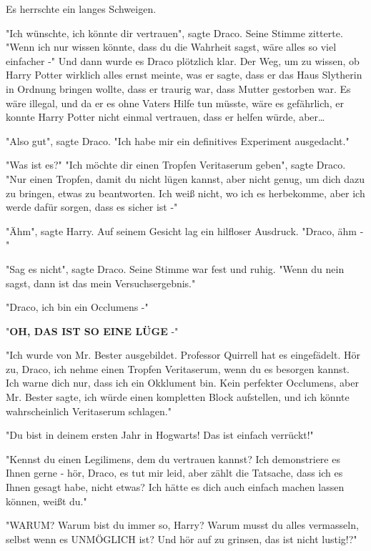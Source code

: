 {Es herrschte ein langes Schweigen.

"Ich wünschte, ich könnte dir vertrauen", sagte Draco. Seine Stimme zitterte. "Wenn ich nur wissen könnte, dass du die Wahrheit sagst, wäre alles so viel einfacher -" Und dann wurde es Draco plötzlich klar. Der Weg, um zu wissen, ob Harry Potter wirklich alles ernst meinte, was er sagte, dass er das Haus Slytherin in Ordnung bringen wollte, dass er traurig war, dass Mutter gestorben war. Es wäre illegal, und da er es ohne Vaters Hilfe tun müsste, wäre es gefährlich, er konnte Harry Potter nicht einmal vertrauen, dass er helfen würde, aber…

"Also gut", sagte Draco. "Ich habe mir ein definitives Experiment ausgedacht."

"Was ist es?" "Ich möchte dir einen Tropfen Veritaserum geben", sagte Draco. "Nur einen Tropfen, damit du nicht lügen kannst, aber nicht genug, um dich dazu zu bringen, etwas zu beantworten. Ich weiß nicht, wo ich es herbekomme, aber ich werde dafür sorgen, dass es sicher ist -"

"Ähm", sagte Harry. Auf seinem Gesicht lag ein hilfloser Ausdruck. "Draco, ähm -"

"Sag es nicht", sagte Draco. Seine Stimme war fest und ruhig. "Wenn du nein sagst, dann ist das mein Versuchsergebnis."

"Draco, ich bin ein Occlumens -"

"\textbf{OH, DAS IST SO EINE LÜGE} -"

"Ich wurde von Mr. Bester ausgebildet. Professor Quirrell hat es eingefädelt. Hör zu, Draco, ich nehme einen Tropfen Veritaserum, wenn du es besorgen kannst. Ich warne dich nur, dass ich ein Okklument bin. Kein perfekter Occlumens, aber Mr. Bester sagte, ich würde einen kompletten Block aufstellen, und ich könnte wahrscheinlich Veritaserum schlagen."

"Du bist in deinem ersten Jahr in Hogwarts! Das ist einfach verrückt!"

"Kennst du einen Legilimens, dem du vertrauen kannst? Ich demonstriere es Ihnen gerne - hör, Draco, es tut mir leid, aber zählt die Tatsache, dass ich es Ihnen gesagt habe, nicht etwas? Ich hätte es dich auch einfach machen lassen können, weißt du."

"WARUM? Warum bist du immer so, Harry? Warum musst du alles vermasseln, selbst wenn es UNMÖGLICH ist? Und hör auf zu grinsen, das ist nicht lustig!?"

}
